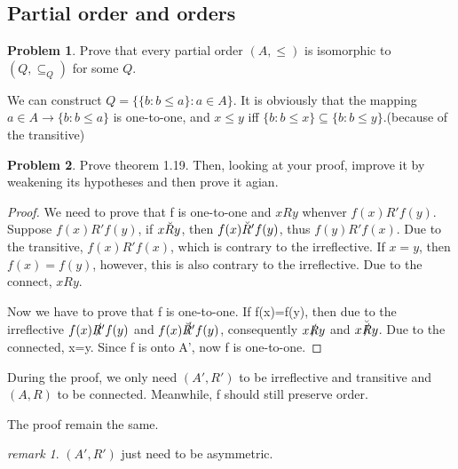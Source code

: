 \documentclass[a4paper,11pt]{article}%
\theoremstyle{remark}
\newtheorem*{remark}{remark}
\theoremstyle{definition}
\newtheorem{problem}{Problem}[subsection]
\begin{document}
\subsection{Partial order and orders}
\begin{problem}
    Prove that every partial order $(A,\leq)$ is isomorphic to $(Q,\subseteq_Q)$
    for some $Q$.

    We can construct $Q=\{\{b:b\leq a\}:a\in A\}$.
    It is obviously that the mapping $a\in A \rightarrow \{b:b\leq a\}$ is 
    one-to-one, and $x\leq y$ iff $\{b:b\leq x\}\subseteq\{b:b\leq y\}$.(because of the transitive)
\end{problem}
\begin{problem}
    Prove theorem 1.19. Then, looking at your proof, improve it by weakening its
    hypotheses and then prove it agian.
\begin{proof}
    We need to prove that f is one-to-one and $xRy$ whenver $f(x)R'f(y)$.
    Suppose $f(x)R'f(y)$, if $x\Breve{R}y$, then $f(x)\Breve{R}'f(y)$, thus $f(y)R'f(x)$.
    Due to the transitive, $f(x)R'f(x)$, which is contrary to the irreflective.
    If $x=y$, then $f(x)=f(y)$, however, this is also contrary to the irreflective.
    Due to the connect, $xRy$.

    Now we have to prove that f is one-to-one. If f(x)=f(y), then due to the 
    irreflective $f(x)\slashed{R'}f(y)$ and $f(x)\slashed{\Breve{R}'}f(y)$, consequently
    $x\slashed{R}y$ and $x\Breve{\slashed{R}}y$. Due to the connected, x=y. Since f is onto A',
    now f is one-to-one.
\end{proof}
 
During the proof, we only need  $(A',R')$ to be  irreflective and transitive
and $(A,R)$ to be connected. Meanwhile, f should still preserve order.

The proof remain the same.
\begin{remark}
    $(A',R')$ just need to be asymmetric.
\end{remark}
\end{problem}
\end{document}
